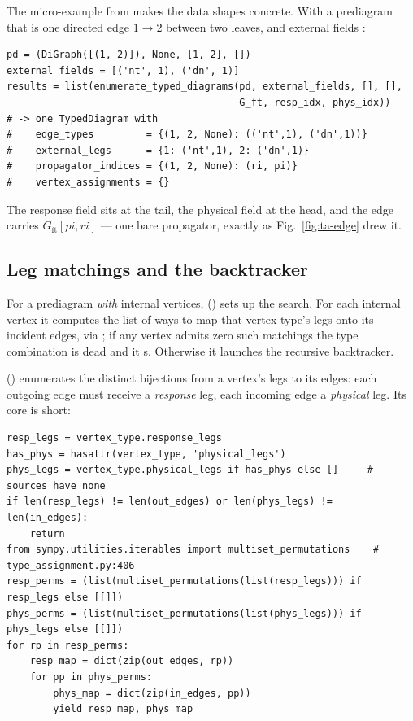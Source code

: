 \begin{example}
The micro-example from  makes the data
shapes concrete. With a prediagram that is one directed edge $1\to2$ between two
leaves, and external fields \code{[('nt', 1), ('dn', 1)]}:
\begin{lstlisting}
pd = (DiGraph([(1, 2)]), None, [1, 2], [])
external_fields = [('nt', 1), ('dn', 1)]
results = list(enumerate_typed_diagrams(pd, external_fields, [], [],
                                        G_ft, resp_idx, phys_idx))
# -> one TypedDiagram with
#    edge_types         = {(1, 2, None): (('nt',1), ('dn',1))}
#    external_legs      = {1: ('nt',1), 2: ('dn',1)}
#    propagator_indices = {(1, 2, None): (ri, pi)}
#    vertex_assignments = {}
\end{lstlisting}
The response field  sits at the tail, the physical field  at
the head, and the edge carries $G_{\mathrm{ft}}[pi, ri]$ --- one bare propagator,
exactly as Fig.~\ref{fig:ta-edge} drew it.
\end{example}

\subsection{Leg matchings and the backtracker}

For a prediagram \emph{with} internal vertices, 
() sets up the search. For each internal
vertex it computes the list of ways to map that vertex type's legs onto its
incident edges, via ; if any vertex admits zero such
matchings the type combination is dead and it s. Otherwise it
launches the recursive backtracker.

() enumerates the distinct bijections from a
vertex's legs to its edges: each outgoing edge must receive a \emph{response}
leg, each incoming edge a \emph{physical} leg. Its core is short:

\begin{lstlisting}
resp_legs = vertex_type.response_legs
has_phys = hasattr(vertex_type, 'physical_legs')
phys_legs = vertex_type.physical_legs if has_phys else []     # sources have none
if len(resp_legs) != len(out_edges) or len(phys_legs) != len(in_edges):
    return
from sympy.utilities.iterables import multiset_permutations    # type_assignment.py:406
resp_perms = (list(multiset_permutations(list(resp_legs))) if resp_legs else [[]])
phys_perms = (list(multiset_permutations(list(phys_legs))) if phys_legs else [[]])
for rp in resp_perms:
    resp_map = dict(zip(out_edges, rp))
    for pp in phys_perms:
        phys_map = dict(zip(in_edges, pp))
        yield resp_map, phys_map
\end{lstlisting}


